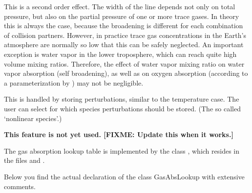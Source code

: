 This is a second order effect. The width of the line depends not only
on total pressure, but also on the partial pressure of one or more
trace gases. In theory this is always the case, because the broadening
is different for each combination of collision partners. However, in
practice trace gas concentrations in the Earth's atmosphere are
normally so low that this can be safely neglected. An important
exception is water vapor in the lower troposphere, which can reach
quite high volume mixing ratios. Therefore, the effect of water vapor
mixing ratio on water vapor absorption (self broadening), as well as
on oxygen absorption (according to a parameterization by
\citet{pwr:93}) may not be negligible.

This is handled by storing perturbations, similar to the temperature
case. The user can select for which species perturbations should be
stored. (The so called `nonlinear species'.)

\textbf{This feature is not yet used. [FIXME: Update this when it works.]}


The gas absorption lookup table is implemented by the class
, which resides in the files
 and .


Below you find the actual declaration of the class GasAbsLookup with
extensive comments.

